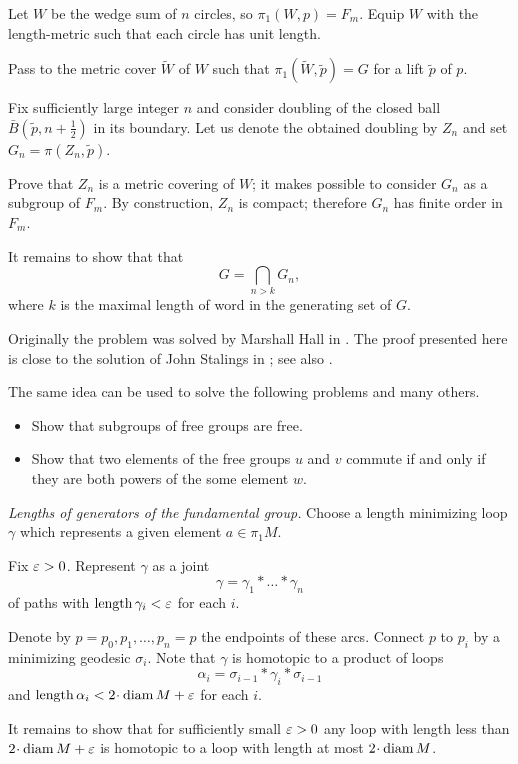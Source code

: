 Let $W$ be the wedge sum of $n$ circles, 
so  $\pi_1(W,p)=F_m$.
Equip $W$ with the length-metric 
such that each circle has unit length.

Pass to the metric cover $\tilde W$ of $W$ 
such that  $\pi_1(\tilde W,\tilde p)=G$ 
for a lift $\tilde p$ of $p$.

Fix sufficiently large integer $n$ and consider doubling of the closed ball $\bar B(\tilde p,n+\frac12)$ in its boundary.
Let us denote the obtained doubling by $Z_n$ and set $G_n=\pi(Z_n,\tilde p)$.

Prove that $Z_n$ is a metric covering of $W$;
it makes possible to consider $G_n$ as a subgroup of $F_m$.
By construction, $Z_n$ is compact;
therefore $G_n$ has finite order in $F_m$.


It remains to show that that 
\[G=\bigcap_{n>k} G_n,\]
where $k$ is the maximal length of word in the generating set of $G$.

 
Originally the problem was solved by Marshall Hall in \cite{hall}.
The proof presented here is close to the solution of John Stalings in \cite{stallings};
see also \cite{wilton}.

The same idea can be used to solve the following problems and many others.
\begin{itemize}
\item Show that subgroups of free groups are free.
\item Show that two elements of the free groups $u$ and $v$ commute 
if and only if they are both powers of
the some element $w$.
\end{itemize}



\textit{Lengths of generators of the fundamental group.}
Choose a length minimizing loop $\gamma$ 
which represents a given element $a\in\pi_1M$.

Fix $\varepsilon>0$.
Represent $\gamma$ 
as a joint 
\[\gamma=\gamma_1{*}\dots{*}\gamma_n\]
of paths with $\operatorname{\rm length}\gamma_i<\varepsilon$ for each $i$.
 
Denote by $p=p_0,p_1,\dots, p_n=p$ the endpoints of these arcs.
Connect $p$ to $p_i$ by a minimizing geodesic $\sigma_i$.
Note that $\gamma$ is homotopic to a product of loops
\[\alpha_i=\sigma_{i-1}{*}\gamma_i{*}\sigma_{i-1}\]
and $\length \alpha_i<2\cdot\diam M+\eps$ for each $i$.

It remains to show that for sufficiently small $\varepsilon>0$
any loop with length less than $2\cdot\diam M+\eps$ 
is homotopic to a loop with length at most $2\cdot\diam M$.

